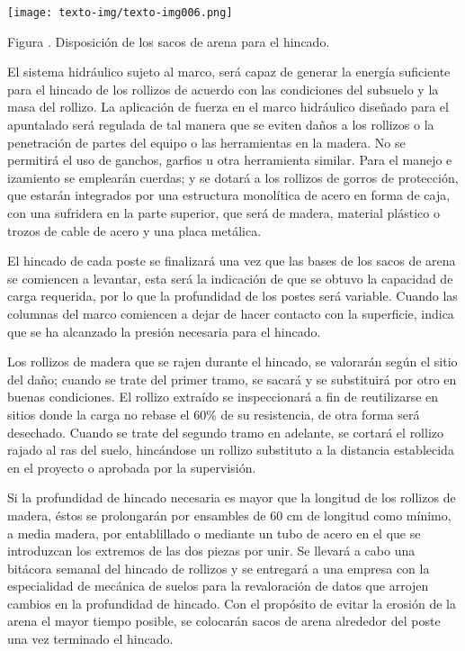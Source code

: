 \documentclass{article}
\newcounter{Figura}
\renewcommand\theFigura{\arabic{Figura}}
\begin{document}
\bigskip

 \texttt{[image: texto-img/texto-img006.png]} 

Figura \stepcounter{Figura}{\theFigura}. Disposición de los sacos de arena para el hincado.


\bigskip


\bigskip

El sistema hidráulico sujeto al marco, será capaz de generar la energía suficiente para el hincado de los rollizos de acuerdo con las condiciones del subsuelo y la masa del rollizo. La aplicación de fuerza en el marco hidráulico diseñado para el apuntalado será regulada de tal manera que se eviten daños a los rollizos o la penetración de partes del equipo o las herramientas en la madera. No se permitirá el uso de ganchos, garfios u otra herramienta similar. Para el manejo e izamiento se emplearán cuerdas; y se dotará a los rollizos de gorros de protección, que estarán integrados por una estructura monolítica de acero en forma de caja, con una sufridera en la parte superior, que será de madera, material plástico o trozos de cable de acero y una placa metálica.


\bigskip

El hincado de cada poste se finalizará una vez que las bases de los sacos de arena se comiencen a levantar, esta será la indicación de que se obtuvo la capacidad de carga requerida, por lo que la profundidad de los postes será variable. Cuando las columnas del marco comiencen a dejar de hacer contacto con la superficie, indica que se ha alcanzado la presión necesaria para el hincado.


\bigskip

Los rollizos de madera que se rajen durante el hincado, se valorarán según el sitio del daño; cuando se trate del primer tramo, se sacará y se substituirá por otro en buenas condiciones. El rollizo extraído se inspeccionará a fin de reutilizarse en sitios donde la carga no rebase el 60\% de su resistencia, de otra forma será desechado. Cuando se trate del segundo tramo en adelante, se cortará el rollizo rajado al ras del suelo, hincándose un rollizo substituto a la distancia establecida en el proyecto o aprobada por la supervisión. 


\bigskip

Si la profundidad de hincado necesaria es mayor que la longitud de los rollizos de madera, éstos se prolongarán por ensambles de 60 cm de longitud como mínimo, a media madera, por entablillado o mediante un tubo de acero en el que se introduzcan los extremos de las dos piezas por unir. Se llevará a cabo una bitácora semanal del hincado de rollizos y se entregará a una empresa con la especialidad de mecánica de suelos para la revaloración de datos que arrojen cambios en la profundidad de hincado. Con el propósito de evitar la erosión de la arena el mayor tiempo posible, se colocarán sacos de arena alrededor del poste una vez terminado el hincado.
\end{document}

